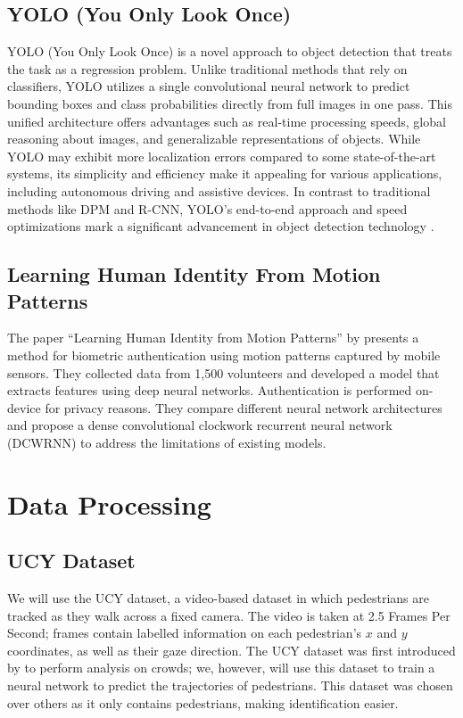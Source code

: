 \documentclass{article} %
\begin{document}
\subsection{YOLO (You Only Look Once)}
YOLO (You Only Look Once) is a novel approach to object detection that treats the task as a regression problem. Unlike traditional methods that rely on classifiers, YOLO utilizes a single convolutional neural network to predict bounding boxes and class probabilities directly from full images in one pass. This unified architecture offers advantages such as real-time processing speeds, global reasoning about images, and generalizable representations of objects. While YOLO may exhibit more localization errors compared to some state-of-the-art systems, its simplicity and efficiency make it appealing for various applications, including autonomous driving and assistive devices. In contrast to traditional methods like DPM and R-CNN, YOLO's end-to-end approach and speed optimizations mark a significant advancement in object detection technology \citep{redmon2016look}.
\subsection{Learning Human Identity From Motion Patterns}
The paper ``Learning Human Identity from Motion Patterns'' by \citet{neverova2016} presents a method for biometric authentication using motion patterns captured by mobile sensors. They collected data from 1,500 volunteers and developed a model that extracts features using deep neural networks. Authentication is performed on-device for privacy reasons. They compare different neural network architectures and propose a dense convolutional clockwork recurrent neural network (DCWRNN) to address the limitations of existing models. 
\section{Data Processing}
\subsection{UCY Dataset}
We will use the UCY dataset, a video-based dataset in which pedestrians are tracked as they walk across a fixed camera. The video is taken at 2.5 Frames Per Second; frames contain labelled information on each pedestrian's $x$ and $y$ coordinates, as well as their gaze direction. The UCY dataset was first introduced by \citet{lerner2007ucy} to perform analysis on crowds; we, however, will use this dataset to train a neural network to predict the trajectories of pedestrians. This dataset was chosen over others as it only contains pedestrians, making identification easier. 
\end{document}
